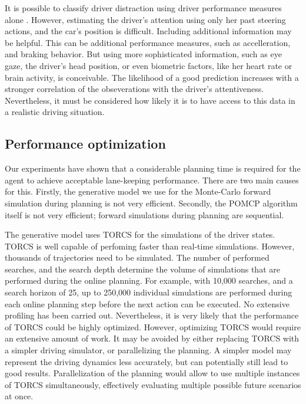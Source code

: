 It is possible to classify driver distraction using driver performance measures alone \parencite{dist-det-perf} . However, estimating the driver's attention using only her past steering actions, and the car's position is difficult. Including additional information may be helpful. This can be additional performance measures, such as accelleration, and braking behavior. But using more sophisticated information, such as eye gaze, the driver's head position, or even biometric factors, like her heart rate or brain activity, is conceivable. The likelihood of a good prediction increases with a stronger correlation of the obseverations with the driver's attentiveness. Nevertheless, it must be considered how likely it is to have access to this data in a realistic driving situation.

\subsection{Performance optimization}
\label{sec:perf_opt}

Our experiments have shown that a considerable planning time is required for the agent to achieve acceptable lane-keeping performance. There are two main causes for this. Firstly, the generative model we use for the Monte-Carlo forward simulation during planning is not very efficient. Secondly, the POMCP algorithm itself is not very efficient; forward simulations during planning are sequential.

The generative model uses TORCS for the simulations of the driver states. TORCS is well capable of perfoming faster than real-time simulations. However, thousands of trajectories need to be simulated. The number of performed searches, and the search depth determine the volume of simulations that are performed during the online planning. For example, with 10,000 searches, and a search horizon of 25, up to 250,000 individual simulations are performed during each online planning step before the next action can be executed. No extensive profiling has been carried out. Nevertheless, it is very likely that the performance of TORCS could be highly optimized. However, optimizing TORCS would require an extensive amount of work. It may be avoided by either replacing TORCS with a simpler driving simulator, or parallelizing the planning. A simpler model may represent the driving dynamics less accurately, but can potentially still lead to good results. Parallelization of the planning would allow to use multiple instances of TORCS simultaneously, effectively evaluating multiple possible future scenarios at once.

